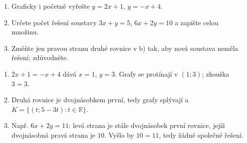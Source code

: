 \documentclass[11pt,a4paper]{article}
\begin{document}
\begin{zadaniReseniBox}
\begin{enumerate}[label=\alph*)]
\item Graficky i početně vyřešte $y=2x+1$, $y=-x+4$.
\item Určete počet řešení soustavy $3x+y=5$, $6x+2y=10$ a zapište celou množinu.
\item Změňte jen pravou stranu druhé rovnice v b) tak, aby nová soustava neměla řešení; zdůvodněte.
\end{enumerate}
\tcblower
\begin{enumerate}[label=\alph*)]
\item $2x+1=-x+4$ dává $x=1$, $y=3$. Grafy se protínají v $(1;3)$; zkouška $3=3$.
\item Druhá rovnice je dvojnásobkem první, tedy grafy splývají a $K=\{(t;5-3t):t\in\mathbb R\}$.
\item Např. $6x+2y=11$: levá strana je stále dvojnásobek první rovnice, jejíž dvojnásobná pravá strana je $10$. Vyšlo by $10=11$, tedy žádné společné řešení.
\end{enumerate}
\end{zadaniReseniBox}
\end{document}
